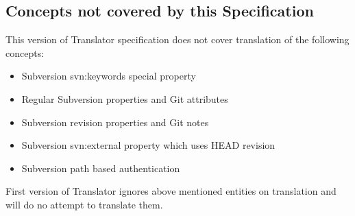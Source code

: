\subsection{Concepts not covered by this Specification}
This version of Translator specification does not cover translation of the following concepts:
\begin{itemize}
\item Subversion svn:keywords special property
\item Regular Subversion properties and Git attributes
\item Subversion revision properties and Git notes
\item Subversion svn:external property which uses HEAD revision
\item Subversion path based authentication
\end{itemize}

First version of Translator ignores above mentioned entities on translation and will do no attempt to translate them.